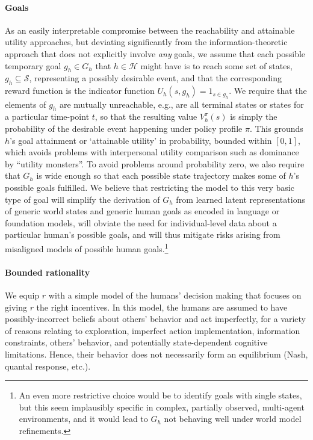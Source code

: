 \documentclass[letterpaper]{article} %
\def\H{\mathcal{H}}
\def\S{\mathcal{S}}
\begin{document}
\paragraph{Goals} As an easily interpretable compromise between the reachability \cite{krakovna2018measuring} and attainable utility \cite{turner2020conservative} approaches, but deviating significantly from the information-theoretic approach \cite{klyubin2005empowerment} that does not explicitly involve {\em any} goals, we assume that each possible temporary goal $g_h\in G_h$ that $h\in\H$ might have is to reach some set of states, $g_h\subseteq\S$, representing a possibly desirable event, and that the corresponding reward function is the indicator function $U_h(s,g_h) = 1_{s\in g_h}$. 
We require that the elements of $g_h$ are mutually unreachable, e.g., are all terminal states or states for a particular time-point $t$, so that the resulting value $V_h^\pi(s)$ is simply the probability of the desirable event happening under policy profile $\pi$.
This grounds $h$'s goal attainment or `attainable utility' in probability, bounded within $[0,1]$, which avoids problems with interpersonal utility comparison such as dominance by ``utility monsters''.
To avoid problems around probability zero, we also require that $G_h$ is wide enough so that each possible state trajectory makes some of $h$'s possible goals fulfilled. 
We believe that restricting the model to this very basic type of goal will simplify the derivation of $G_h$ from learned latent representations of generic world states and generic human goals as encoded in language or foundation models, will obviate the need for individual-level data about a particular human's possible goals, and will thus mitigate risks arising from misaligned models of possible human goals.\footnote{%
    An even more restrictive choice would be to identify goals with single states, but this seem implausibly specific in complex, partially observed, multi-agent environments, and it would lead to $G_h$ not behaving well under world model refinements. 
    }

\paragraph{Bounded rationality} 
We equip $r$ with a simple model of the humans' decision making that focuses on giving $r$ the right incentives. 
In this model, the humans are assumed to have possibly-incorrect beliefs about others' behavior and act imperfectly, for a variety of reasons relating to exploration, imperfect action implementation, information constraints, others' behavior, and potentially state-dependent cognitive limitations.
Hence, their behavior does not necessarily form an equilibrium (Nash, quantal response, etc.).
\end{document}
